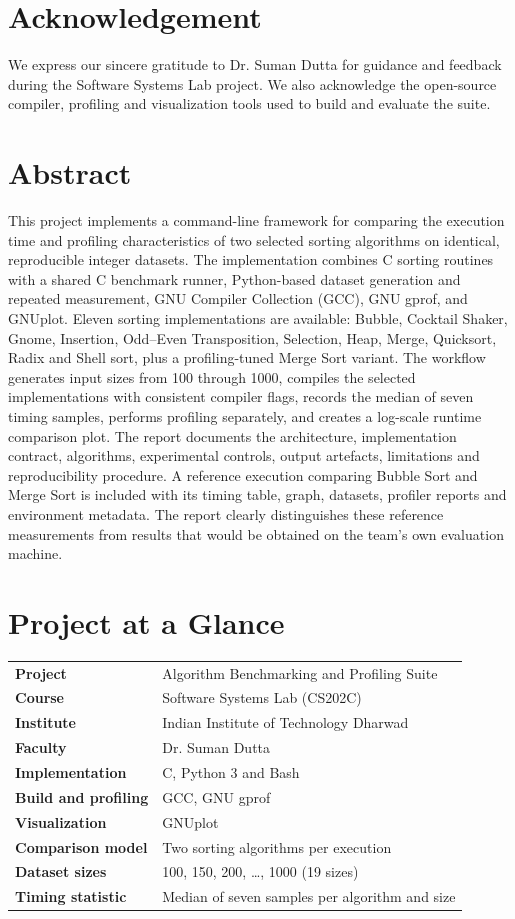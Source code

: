 \documentclass[12pt,a4paper,oneside]{report}
\begin{document}
\chapter*{Acknowledgement}
We express our sincere gratitude to Dr. Suman Dutta for guidance and feedback during the Software Systems Lab project. We also acknowledge the open-source compiler, profiling and visualization tools used to build and evaluate the suite.
\chapter*{Abstract}
This project implements a command-line framework for comparing the execution time and profiling characteristics of two selected sorting algorithms on identical, reproducible integer datasets. The implementation combines C sorting routines with a shared C benchmark runner, Python-based dataset generation and repeated measurement, GNU Compiler Collection (GCC), GNU gprof, and GNUplot. Eleven sorting implementations are available: Bubble, Cocktail Shaker, Gnome, Insertion, Odd--Even Transposition, Selection, Heap, Merge, Quicksort, Radix and Shell sort, plus a profiling-tuned Merge Sort variant. The workflow generates input sizes from 100 through 1000, compiles the selected implementations with consistent compiler flags, records the median of seven timing samples, performs profiling separately, and creates a log-scale runtime comparison plot. The report documents the architecture, implementation contract, algorithms, experimental controls, output artefacts, limitations and reproducibility procedure. A reference execution comparing Bubble Sort and Merge Sort is included with its timing table, graph, datasets, profiler reports and environment metadata. The report clearly distinguishes these reference measurements from results that would be obtained on the team's own evaluation machine.
\chapter*{Project at a Glance}
\begin{tabularx}{\textwidth}{>{\bfseries}p{}X}
Project & Algorithm Benchmarking and Profiling Suite\\
Course & Software Systems Lab (CS202C)\\
Institute & Indian Institute of Technology Dharwad\\
Faculty & Dr. Suman Dutta\\
Implementation & C, Python 3 and Bash\\
Build and profiling & GCC, GNU gprof\\
Visualization & GNUplot\\
Comparison model & Two sorting algorithms per execution\\
Dataset sizes & 100, 150, 200, \ldots, 1000 (19 sizes)\\
Timing statistic & Median of seven samples per algorithm and size\\
\end{tabularx}
\tableofcontents\listoffigures\listoftables\clearpage
{}
\end{document}
